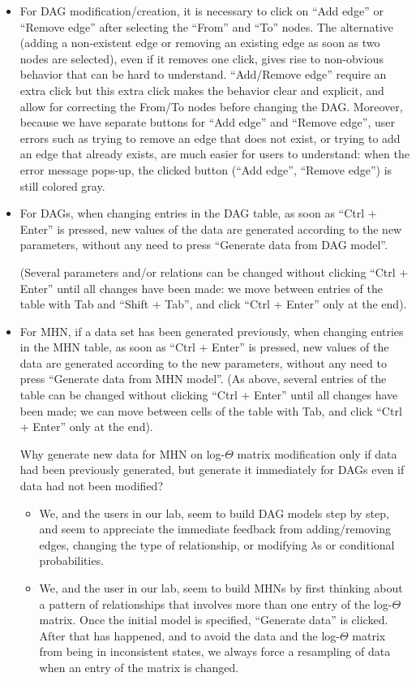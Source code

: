 \documentclass[a4paper,11pt]{article}
\begin{document}
\begin{itemize}
  
\item For DAG modification/creation, it is necessary to click on ``Add edge'' or ``Remove edge'' after selecting the ``From'' and ``To'' nodes. The alternative (adding a non-existent edge or removing an existing edge as soon as two nodes are selected), even if it removes one click, gives rise to non-obvious behavior that can be hard to understand. ``Add/Remove edge'' require an extra click but this extra click makes the behavior clear and explicit, and allow for correcting the From/To nodes before changing the DAG. Moreover, because we have separate buttons for ``Add edge'' and ``Remove edge'', user errors such as trying to remove an edge that does not exist, or trying to add an edge that already exists, are much easier for users to understand: when the error message pops-up, the clicked button (``Add edge'', ``Remove edge'') is still colored gray.

  
  
\item For DAGs, when changing entries in the DAG table, as soon as ``Ctrl + Enter'' is pressed, new values of the data are generated according to the new parameters, without any need to press ``Generate data from DAG model''.

  (Several parameters and/or relations can be changed without clicking ``Ctrl + Enter'' until all changes have been made: we move between entries of the table with Tab and ``Shift + Tab'', and click ``Ctrl + Enter'' only at the end).

  
  


\item For MHN, if a data set has been generated previously, when changing entries in the MHN table, as soon as ``Ctrl + Enter'' is pressed, new values of the data are generated according to the new parameters, without any need to press ``Generate data from MHN model''.  (As above, several entries of the table can be changed without clicking ``Ctrl + Enter'' until all changes have been made; we can move between cells of the table with Tab, and click ``Ctrl + Enter'' only at the end).

  Why generate new data for MHN on log-$\Theta$ matrix modification only if data had been previously generated, but generate it immediately for DAGs even if data had not been modified?
  
  \begin{itemize}
  \item We, and the users in our lab, seem to build DAG models step by step, and seem to appreciate the immediate feedback from adding/removing edges, changing the type of relationship, or modifying $\lambda$s or conditional probabilities. 
  \item We, and the user in our lab, seem to build MHNs by first thinking about a pattern of relationships that involves more than one entry of the log-$\Theta$ matrix. Once the initial model is specified, ``Generate data'' is clicked. After that has happened, and to avoid the data and the log-$\Theta$ matrix from being in inconsistent states, we always force a resampling of data when an entry of the matrix is changed.
    

\end{itemize}
\end{itemize}
\end{document}
